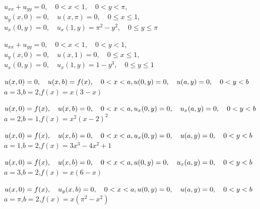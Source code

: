 \begin{exerciselist}
\item\label{exer:12.3.15}$u_{xx}+u_{yy}=0,\quad 0<x<1,\quad  0<y<\pi$,\\
$u_y(x,0)=0,\quad u(x,\pi)=0,\quad 0\le x\le 1$,\\
$u_x(0,y)=0,\quad u_x(1,y)=\pi^2-y^2,\quad 0\le y\le \pi$

\item\label{exer:12.3.16}$u_{xx}+u_{yy}=0,\quad 0<x<1,\quad  0<y<1$,\\
$u_y(x,0)=0,\quad u(x,1)=0,\quad 0\le x\le 1$,\\
$u_x(0,y)=0,\quad u_x(1,y)=1-y^3,\quad 0\le y\le 1$


\item\label{exer:12.3.17}\Cex
$u(x,0)=0,\quad u(x,b)=f(x),\quad 0<x<a,\\
u(0,y)=0,\quad u(a,y)=0,\quad 0<y<b$  \\
$a=3$,\quad $b=2$,\quad $f(x)=x(3-x)$

\item\label{exer:12.3.18}$u(x,0)=f(x),\quad u(x,b)=0,\quad 0<x<a,\\
u_x(0,y)=0,\quad u_x(a,y)=0,\quad 0<y<b$  \\
$a=2$,\quad $b=1$,\quad $f(x)=x^2(x-2)^2$

\item\label{exer:12.3.19}$u(x,0)=f(x),\quad u(x,b)=0,\quad 0<x<a,\\
u_x(0,y)=0,\quad u(a,y)=0,\quad 0<y<b$  \\
$a=1$,\quad $b=2$,\quad $f(x)=3x^3-4x^2+1$


\item\label{exer:12.3.20}$u(x,0)=f(x),\quad u(x,b)=0,\quad 0<x<a,\\
u(0,y)=0,\quad u_x(a,y)=0,\quad 0<y<b$  \\
$a=3$,\quad $b=2$,\quad $f(x)=x(6-x)$

\item\label{exer:12.3.21}$u(x,0)=f(x),\quad u_y(x,b)=0,\quad 0<x<a,\\
u(0,y)=0,\quad u(a,y)=0,\quad 0<y<b$  \\
$a=\pi$,\quad $b=2$,\quad $f(x)=x(\pi^2-x^2)$



\end{exerciselist}
